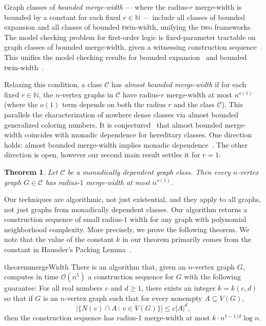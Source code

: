 \documentclass[11pt]{article}
\newtheorem{theorem}{Theorem}
\theoremstyle{definition}
\newcommand{\CC}{{\mathscr C}}
\newcommand{\N}{\mathbb{N}}
\renewcommand{\leq}{\leqslant}
\renewcommand{\geq}{\geqslant}
\newcommand{\set}[1]{\{#1\}}
\begin{document}
Graph classes of \emph{bounded merge-width} --- where the radius-$r$ merge-width is bounded by a constant for each fixed $r\in \N$ --- include all classes of bounded expansion and all classes of bounded twin-width, unifying the two frameworks.
The model checking problem for first-order logic is fixed-parameter tractable on graph classes of bounded merge-width, given a witnessing construction sequence~\cite{mw-mc}.
This unifies the model checking results for bounded expansion~\cite{DvorakKT13-journal} and bounded twin-width~\cite{twwI}.

Relaxing this condition, a class $\CC$ has \emph{almost bounded merge-width} if for each fixed $r\in \N$, the $n$-vertex graphs in $\CC$ have radius-$r$ merge-width at most $n^{o(1)}$ (where the ${o(1)}$ term depends on both the radius $r$ and the class $\CC$). This parallels the characterization of nowhere dense classes via almost bounded generalized coloring numbers. It is conjectured~\cite{mw-mc} that almost bounded merge-width coincides with monadic dependence for hereditary classes.
One direction holds: almost bounded merge-width implies monadic dependence~\cite{flip-breakability}. The other direction is open, however our second main result settles it for $r=1$:

\begin{theorem}\label{thm:main}
Let $\CC$ be a monadically dependent graph class.
Then every $n$-vertex graph $G\in \CC$ has radius-$1$ merge-width at most $n^{o(1)}$.
\end{theorem}

Our techniques are algorithmic, not just existential, and they apply to all graphs, not just graphs from monadically dependent classes. Our algorithm returns a construction sequence of small radius-$1$ width for any graph with polynomial neighborhood complexity. More precisely, we prove the following theorem. We note that the value of the constant $k$ in our theorem primarily comes from the constant in Haussler's Packing Lemma~\cite{Haussler95}.

\begin{restatable}{theorem}{mergeWidth}
\label{thm:mergeWidth}
    There is an algorithm that, given an $n$-vertex graph $G$,  computes in time $\mathcal{O}(n^5)$ a construction sequence for $G$ with the following guarantee:
    For all real numbers $c$ and $d\geq 1$, there exists an integer $k = k(c,d)$ so that if $G$ is an $n$-vertex graph such that for every nonempty $A \subseteq V(G)$,
    \[\Big|\set{N(v)\cap A\,:\, v\in V(G)}\Big| \leq c|A|^d,\]
    then the construction sequence has radius-1 merge-width at most $k\cdot n^{1-1/d} \log{n}$.
\end{restatable}
\end{document}
